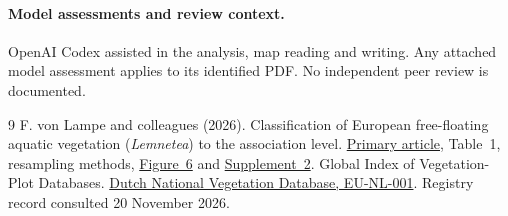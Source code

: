 \documentclass[11pt]{article}
\begin{document}
\paragraph{Model assessments and review context.} OpenAI Codex assisted in the analysis, map reading and writing. Any attached model assessment applies to its identified PDF. No independent peer review is documented.
\begin{thebibliography}{9}
 F. von Lampe and colleagues (2026). Classification of European free-floating aquatic vegetation (\emph{Lemnetea}) to the association level. \href{https://doi.org/10.3897/VCS.188965}{Primary article}, Table~1, resampling methods, \href{https://binary.pensoft.net/fig/1841079/oo/file.jpg}{Figure~6} and \href{https://binary.pensoft.net/file/1841081}{Supplement~2}.
 Global Index of Vegetation-Plot Databases. \href{https://www.givd.info/api/givd/EU-NL-001}{Dutch National Vegetation Database, EU-NL-001}. Registry record consulted 20 November 2026.
\end{thebibliography}
\end{document}
